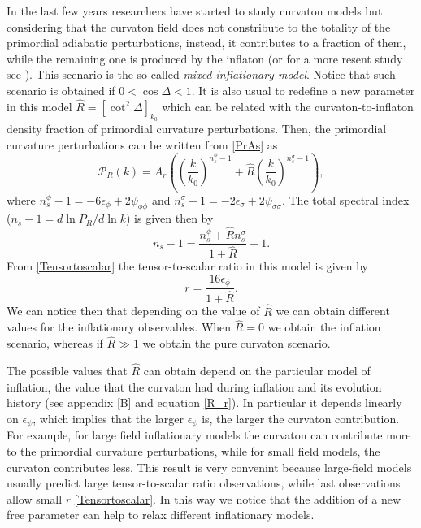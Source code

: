 \documentclass[amssymb,twocolumn,prd,nofootinbib,showpacs]{revtex4-1}
\begin{document}
In the last few years researchers have started to study curvaton models but considering that the curvaton field does not constribute to the totality of the primordial adiabatic perturbations, instead, it contributes to a fraction of them, while the remaining one is produced by the inflaton \cite{curvaton4,curvaton5,curvaton6,curvaton7,curvaton8} (or for a more resent study see \cite{curvaton3}). This scenario is the so-called \textit{mixed inflationary model}. Notice that such scenario is obtained if $0<\cos\Delta <1$. It is also usual to redefine a new parameter in this model $\hat R= [\cot^2\Delta]_{k_0}$ which can be related with the curvaton-to-inflaton density fraction of primordial curvature perturbations. Then, the primordial curvature perturbations can be written from \eqref{PrAs} as
\begin{equation}\label{PCr}
\mathcal{P}_R(k)=A_r\left(\left(\frac{k}{k_{0}}\right)^{n_s^\phi-1}+\hat R\left(\frac{k}{k_{0}}\right)^{n_s^\sigma-1}\right),
\end{equation}
where $n_s^\phi-1 = -6\epsilon_\phi+2\psi_{\phi\phi}$ and $n_s^\sigma-1 = -2\epsilon_\sigma+2\psi_{\sigma\sigma}$.
The total spectral index ($n_s-1=d\ln P_R/d\ln k$) is given then by
\begin{equation}
n_s-1=\frac{n_s^\phi+\hat R n_s^\sigma}{1+\hat R}-1.
\end{equation}
From \eqref{Tensortoscalar} the tensor-to-scalar ratio in this model is given by
\begin{equation}\label{tensortoscalar}
r=\frac{16\epsilon_\phi}{1+\hat R}.
\end{equation}		
We can notice then that depending on the value of $\hat R$ we can obtain different values for the inflationary observables. When $\hat R=0$ we obtain the inflation scenario, whereas if $\hat R\gg 1$ we obtain the pure curvaton scenario.  

The possible values that $\hat R$ can obtain depend on the particular model of inflation, the value that the curvaton had during inflation and its evolution history (see appendix [B] and equation \eqref{R_r}). In particular it depends linearly on $\epsilon_\psi$, which implies that the larger $\epsilon_\psi$ is, the larger the curvaton contribution. For example, for large field inflationary models the curvaton can contribute more to the primordial curvature perturbations, while for small field models, the curvaton contributes less. This result is very convenint because large-field models usually predict large tensor-to-scalar ratio observations, while last observations allow small $r$ \eqref{Tensortoscalar}. In this way we notice that the addition of a new free parameter can help to relax different inflationary models.  
\end{document}
